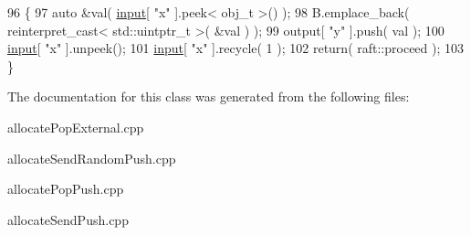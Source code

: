 \begin{DoxyCode}
96     \{
97         \textcolor{keyword}{auto} &val( \hyperlink{classraft_1_1kernel_a6edbe35a56409d402e719b3ac36d6554}{input}[ \textcolor{stringliteral}{"x"} ].peek< obj\_t >() );
98         B.emplace\_back( reinterpret\_cast< std::uintptr\_t >( &val ) ); 
99         output[ \textcolor{stringliteral}{"y"} ].push( val );
100         \hyperlink{classraft_1_1kernel_a6edbe35a56409d402e719b3ac36d6554}{input}[ \textcolor{stringliteral}{"x"} ].unpeek();
101         \hyperlink{classraft_1_1kernel_a6edbe35a56409d402e719b3ac36d6554}{input}[ \textcolor{stringliteral}{"x"} ].recycle( 1 );
102         \textcolor{keywordflow}{return}( raft::proceed );
103     \}
\end{DoxyCode}


The documentation for this class was generated from the following files\+:\begin{DoxyCompactItemize}
\item 
allocate\+Pop\+External.\+cpp\item 
allocate\+Send\+Random\+Push.\+cpp\item 
allocate\+Pop\+Push.\+cpp\item 
allocate\+Send\+Push.\+cpp\end{DoxyCompactItemize}
